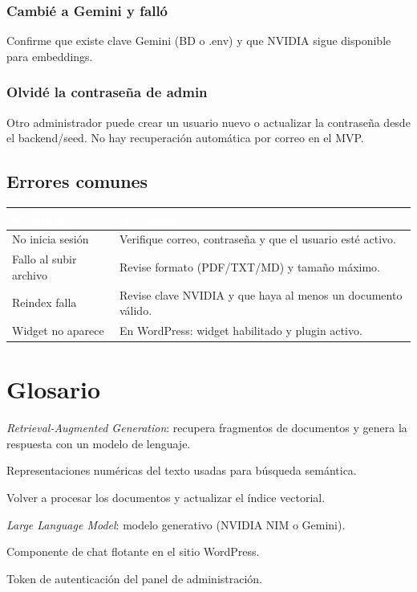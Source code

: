 \documentclass[11pt, a4paper, oneside]{report}
\begin{document}
\subsection*{Cambié a Gemini y falló}
Confirme que existe clave Gemini (BD o .env) y que NVIDIA sigue
disponible para embeddings.

\subsection*{Olvidé la contraseña de admin}
Otro administrador puede crear un usuario nuevo o actualizar la contraseña
desde el backend/seed. No hay recuperación automática por correo en el MVP.

\section{Errores comunes}
\begin{tabularx}{\linewidth}{L{4.5cm} X}
  \toprule
  \textcolor{white}{\textbf{Situación}} &
  \textcolor{white}{\textbf{Qué hacer}} \\
  \midrule
  No inicia sesión & Verifique correo, contraseña y que el usuario esté activo. \\
  Fallo al subir archivo & Revise formato (PDF/TXT/MD) y tamaño máximo. \\
  Reindex falla & Revise clave NVIDIA y que haya al menos un documento válido. \\
  Widget no aparece & En WordPress: widget habilitado y plugin activo. \\
  \bottomrule
\end{tabularx}

\chapter{Glosario}

\begin{description}[style=nextline, leftmargin=2.2cm, labelindent=0.3cm]
  \item[\textcolor{navy}{RAG}]
    \textit{Retrieval-Augmented Generation}: recupera fragmentos de documentos
    y genera la respuesta con un modelo de lenguaje.
  \item[\textcolor{navy}{Embeddings}]
    Representaciones numéricas del texto usadas para búsqueda semántica.
  \item[\textcolor{navy}{Reindexar}]
    Volver a procesar los documentos y actualizar el índice vectorial.
  \item[\textcolor{navy}{LLM}]
    \textit{Large Language Model}: modelo generativo (NVIDIA NIM o Gemini).
  \item[\textcolor{navy}{Widget}]
    Componente de chat flotante en el sitio WordPress.
  \item[\textcolor{navy}{JWT}]
    Token de autenticación del panel de administración.
\end{description}
\end{document}

